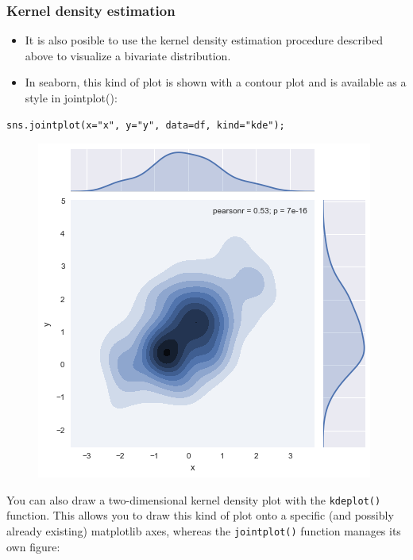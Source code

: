 \documentclass{beamer}
\begin{document}
\begin{frame}[fragile]
\frametitle{Kernel density estimation}
\large
\begin{itemize}
\item It is also posible to use the kernel density estimation procedure described above to visualize a bivariate distribution. 
\item In seaborn, this kind of plot is shown with a contour plot and is available as a style in jointplot():
\end{itemize}


\begin{verbatim}
sns.jointplot(x="x", y="y", data=df, kind="kde");
\end{verbatim}

\begin{figure}
\centering
\includegraphics[width=0.7\linewidth]{images/distributions_34_0}
\end{figure}

You can also draw a two-dimensional kernel density plot with the \texttt{kdeplot()} function. This allows you to draw this kind of plot onto a specific (and possibly already existing) matplotlib axes, whereas the \texttt{jointplot()} function manages its own figure:
\end{frame}
\end{document}
